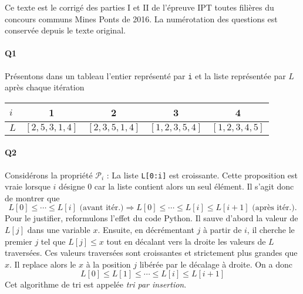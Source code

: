 Ce texte est le corrigé des parties I et II de l'épreuve IPT toutes filières du concours communs Mines Ponts de 2016. La numérotation des questions est conservée depuis le texte original.
\paragraph{Q1} Présentons dans un tableau l'entier représenté par \texttt{i} et la liste représentée par $L$ après chaque itération
\begin{center}
\renewcommand{\arraystretch}{1.3}
\begin{tabular}{l|c|c|c|c}
$i$ & 1                 & 2                 &                 3 & 4                 \\ \hline
$L$ & $[2, 5, 3, 1, 4]$ & $[2, 3, 5, 1, 4]$ & $[1, 2, 3, 5, 4]$ & $[1, 2, 3, 4, 5]$ \\ \hline
\end{tabular}
\end{center}

\paragraph{Q2} Considérons la propriété $\mathcal{P}_i$ :  \og La liste \texttt{L[0:i]} est croissante\fg. \newline
Cette proposition est vraie lorsque $i$ désigne $0$ car la liste contient alors un seul élément. Il s'agit donc de montrer que 
\begin{displaymath}
L[0]\leq \cdots \leq L[i] \text{ (avant itér.)} \Rightarrow  L[0]\leq \cdots \leq L[i] \leq L[i+1] \text{ (après itér.)}. 
\end{displaymath}
Pour le justifier, reformulons l'effet du code Python.\newline
Il sauve d'abord la valeur de $L[j]$ dans une variable $x$. Ensuite, en décrémentant $j$ à partir de $i$, il cherche le premier $j$ tel que $L[j]\leq x$ tout en décalant vers la droite les valeurs de $L$ traversées. Ces valeurs traversées sont croissantes et strictement plus grandes que $x$. Il replace alors le $x$ à la position $j$ libérée par le décalage à droite. On a donc
\begin{displaymath}
  L[0] \leq L[1] \leq \cdots \leq L[i] \leq L[i+1]
\end{displaymath}
Cet algorithme de tri est appelée \emph{tri par insertion}.

